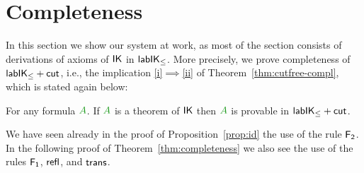 \documentclass[a4paper]{article}
\begin{document}
\section{Completeness}\label{sec:completeness}

In this section we show our system at work, as most of the section
consists of derivations of axioms of $\mathsf{IK}$ in $\mathsf{lab}\mathsf{IK}_{\le}$. More precisely, we prove completeness of $\mathsf{lab}\mathsf{IK}_{\le}+\mathsf{cut}$, i.e., the implication \ref{i}$\implies$\ref{ii} of Theorem~\ref{thm:cutfree-compl}, which is stated again below:

\begin{theorem}\label{thm:completeness}
	For any formula $\fm A$. If $\fm A$ is a theorem of $\mathsf{IK}$ then $\fm A$ is provable in $\mathsf{lab}\mathsf{IK}_{\le} +\mathsf{cut}_{}$.
\end{theorem}

\begin{remark}
	We have seen already in the proof of Proposition~\ref{prop:id} the
	use of the rule $\mathsf{F_2}$. In the following proof of
	Theorem~\ref{thm:completeness} we also see the use of the rules
	$\mathsf{F_1}$, $\mathsf{refl}$, and $\mathsf{trans}$.
\end{remark}
\end{document}
